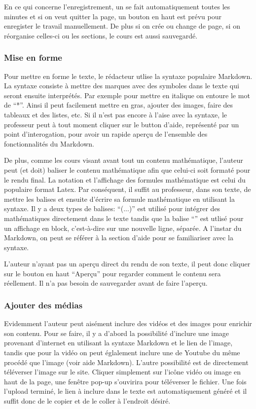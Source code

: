 \documentclass[letterpaper,10pt,english]{sphinxmanual}
\begin{document}
En ce qui concerne l'enregistrement, un se fait automatiquement toutes les minutes et si on veut quitter la page, un bouton en haut est prévu pour enregister le travail manuellement. De plus si on crée ou change de page, si on réorganise celles-ci ou les sections, le cours est aussi sauvegardé.


\subsubsection{Mise en forme}
\label{functionalities:mise-en-forme}
Pour mettre en forme le texte, le rédacteur utlise la syntaxe populaire Markdown. La syntaxe consiste à mettre des marques avec des symboles dans le texte qui seront ensuite interprétés. Par exemple pour mettre en italique on entoure le mot de ``*''. Ainsi il peut facilement mettre en gras, ajouter des images, faire des tableaux et des listes, etc. Si il n'est pas encore à l'aise avec la syntaxe, le professeur peut à tout moment cliquer sur le button d'aide, représenté par un point d'interogation, pour avoir un rapide aperçu de l'ensemble des fonctionnalités du Markdown.

De plus, comme les cours visant avant tout un contenu mathématique, l'auteur peut (et doit) baliser le contenu mathématique afin que celui-ci soit formaté pour le rendu final. La notation et l'affichage des formules mathématique est celui du populaire format Latex. Par conséquent, il suffit au professeur, dans son texte, de mettre les balises et ensuite d'écrire sa formule mathématique en utilisant la syntaxe. Il y a deux types de balises: ``(...)'' est utilisé pour intégrer des mathématiques directement dans le texte tandis que la balise ``\textbar{}\textbar{}'' est utlisé pour un affichage en block, c'est-à-dire sur une nouvelle ligne, séparée. A l'instar du Markdown, on peut se référer à la section d'aide pour se familiariser avec la syntaxe.

L'auteur n'ayant pas un aperçu direct du rendu de son texte, il peut donc cliquer sur le bouton en haut ``Aperçu'' pour regarder comment le contenu sera réellement. Il n'a pas besoin de sauvegarder avant de faire l'aperçu.


\subsubsection{Ajouter des médias}
\label{functionalities:ajouter-des-medias}
Evidemment l'auteur peut aisément inclure des vidéos et des images pour enrichir son contenu. Pour se faire, il y a d'abord la possibilité d'inclure une image provenant d'internet en utilisant la syntaxe Markdown et le lien de l'image, tandis que pour la vidéo on peut églalement inclure une de Youtube du même procédé que l'image (voir aide Markdown). L'autre possibilité est de directement téléverser l'image sur le site. Cliquer simplement sur l'icône vidéo ou image en haut de la page, une fenêtre pop-up s'ouvirira pour téléverser le fichier. Une fois l'upload terminé, le lien à inclure dans le texte est automatiquement généré et il suffit donc de le copier et de le coller à l'endroit désiré.
\end{document}
